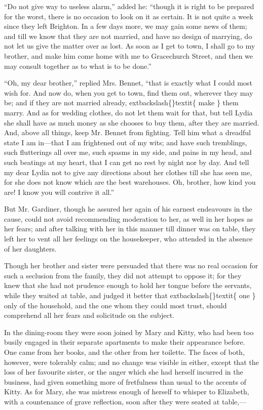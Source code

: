 \documentclass[10pt]{book}
\begin{document}
   “Do not give way to useless alarm,” added he: “though it is right to be
prepared for the worst, there is no occasion to look on it as certain.
It is not quite a week since they left Brighton. In a few days more, we
may gain some news of them; and till we know that they are not married,
and have no design of marrying, do not let us give the matter over as
lost. As soon as I get to town, I shall go to my brother, and make him
come home with me to Gracechurch Street, and then we may consult
together as to what is to be done.”
  

   “Oh, my dear brother,” replied Mrs. Bennet, “that is exactly what I
could most wish for. And now do, when you get to town, find them out,
wherever they may be; and if they are not married already,
   	extbackslash\{\}textit\{
    make
   \}
   them
marry. And as for wedding clothes, do not let them wait for that,
   but
tell Lydia she shall have as much money as she chooses to buy them,
after they are married. And, above all things, keep Mr. Bennet from
fighting. Tell him what a dreadful state I am in—that I am frightened
out of my wits; and have such tremblings, such flutterings all over me,
such spasms in my side, and pains in my head, and such beatings at my
heart, that I can get no rest by night nor by day. And tell my dear
Lydia not to give any directions about her clothes till she has seen me,
for she does not know which are the best warehouses. Oh, brother, how
kind you are! I know you will contrive it all.”
  

   But Mr. Gardiner, though he assured her again of his earnest endeavours
in the cause, could not avoid recommending moderation to her, as well in
her hopes as her fears; and after talking with her in this manner till
dinner was on table, they left her to vent all her feelings on the
housekeeper, who attended in the absence of her daughters.
  

   Though her brother and sister were persuaded that there was no real
occasion for such a seclusion from the family, they did not attempt to
oppose it; for they knew that she had not prudence enough to hold her
tongue before the servants, while they waited at table, and judged it
better that
   	extbackslash\{\}textit\{
    one
   \}
   only of the household, and the one whom they could
most trust, should comprehend all her fears and solicitude on the
subject.
  

   In the dining-room they were soon joined by Mary and Kitty, who had been
too busily engaged in their separate apartments to make their appearance
before. One came from her books, and the other from her toilette. The
faces of both, however, were tolerably calm; and no change was visible
in either, except that the loss of her
   favourite sister, or the anger
which she had herself incurred in the business, had given something more
of fretfulness than usual to the accents of Kitty. As for Mary, she was
mistress enough of herself to whisper to Elizabeth, with a countenance
of grave reflection, soon after they were seated at table,—
  
\end{document}
